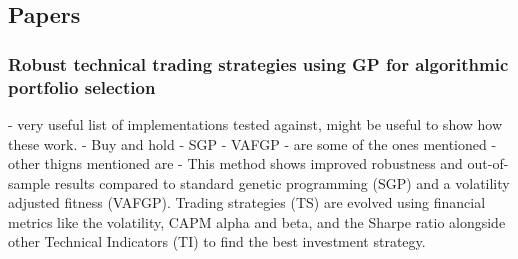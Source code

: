 \documentclass[12pt,a4paper]{article}
\begin{document}
\subsection*{Papers}

\subsubsection*{Robust technical trading strategies using GP for algorithmic portfolio selection}
- very useful list of implementations tested against, might be useful to show how these work.
- Buy and hold
- SGP
- VAFGP
- are some of the ones mentioned
- other thigns mentioned are
- This method shows improved robustness and out-of-sample results compared to standard genetic programming (SGP) and a volatility adjusted fitness (VAFGP). Trading strategies (TS) are evolved using financial metrics like the volatility, CAPM alpha and beta, and the Sharpe ratio alongside other Technical Indicators (TI) to find the best investment strategy.
\end{document}
